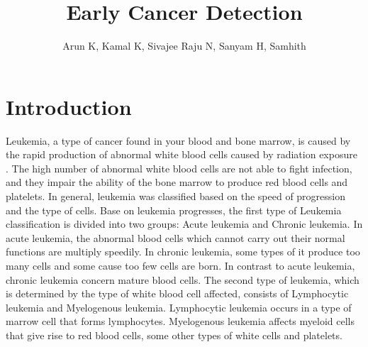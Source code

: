 \documentclass[review]{elsarticle}
\begin{document}
\begin{frontmatter}

\title{Early Cancer Detection}

\author{Arun K, Kamal K, Sivajee Raju N, Sanyam H, Samhith}






\end{frontmatter}


\section*{Introduction}

Leukemia, a type of cancer found in your blood and bone marrow, is caused by the rapid production of abnormal white blood cells caused by radiation exposure \citep{Intro1}. The high number of abnormal white blood cells are not able to fight infection, and they impair the ability of the bone marrow to produce red blood cells and platelets. In general, leukemia was classified based on the speed of progression and the type of cells. Base on leukemia progresses, the first type of Leukemia classification is divided into two groups: Acute leukemia and Chronic leukemia. In acute leukemia, the abnormal blood cells which cannot carry out their normal functions are multiply speedily. In chronic leukemia, some types of it produce too many cells and some cause too few cells are born. In contrast to acute leukemia, chronic leukemia concern mature blood cells. The second type of leukemia, which is determined by the type of white blood cell affected, consists of Lymphocytic leukemia and Myelogenous leukemia. Lymphocytic leukemia occurs in a type of marrow cell that forms lymphocytes. Myelogenous leukemia affects myeloid cells that give rise to red blood cells, some other types of white cells and platelets.   
\end{document}
